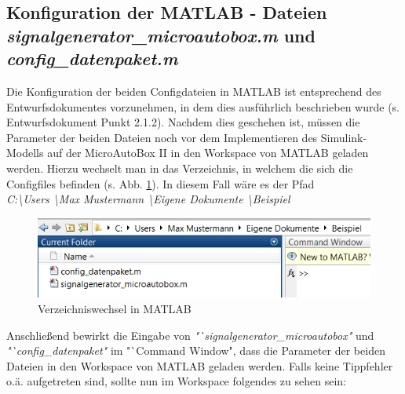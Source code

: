 \documentclass[fontsize = 12pt, paper = a4]{scrreprt}
\begin{document}

\subsection{Konfiguration der MATLAB - Dateien \textit{signalgenerator\_microautobox.m} und \textit{config\_datenpaket.m}}

Die Konfiguration der beiden Configdateien in MATLAB ist entsprechend des Entwurfsdokumentes vorzunehmen, in dem dies ausführlich beschrieben wurde (s. Entwurfsdokument Punkt 2.1.2). Nachdem dies geschehen ist, müssen die Parameter der beiden Dateien noch vor dem Implementieren des Simulink-Modells auf der MicroAutoBox II in den Workspace von MATLAB geladen werden. Hierzu wechselt man in das Verzeichnis, in welchem die sich die Configfiles befinden (s. Abb. \ref{configfilespfad}). In diesem Fall wäre es der Pfad \\ \textit{C:\textbackslash Users \textbackslash Max Mustermann \textbackslash Eigene Dokumente \textbackslash Beispiel}


\begin{figure}[h]
\centering
\includegraphics[scale = 0.65]{configfilespfad}
\caption[Verzeichniswechsel in MATLAB]{Verzeichniswechsel in MATLAB}
\label{configfilespfad}
\end{figure} 

Anschließend bewirkt die Eingabe von \textit{"`signalgenerator\_microautobox"} und \textit{"`config\_datenpaket"} im "`Command Window", dass die Parameter der beiden Dateien in den Workspace von MATLAB geladen werden. Falls keine Tippfehler o.ä. aufgetreten sind, sollte nun im Workspace folgendes zu sehen sein: 
\end{document}

